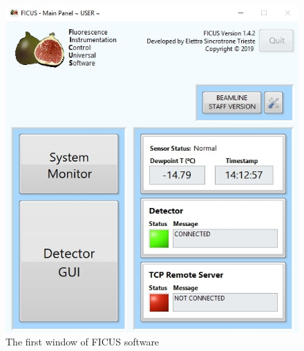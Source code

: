 \documentclass[a4paper,12pt,oneside,pdflatex,italian,final,twocolumn]{article}
\begin{document}
        \begin{figure}[h]
        \centering
        \includegraphics[scale=0.5]{Capture34.jpg} \quad %
        \caption{The first window of FICUS software}\label{fig:fig56}
        \end{figure}
\end{document}
